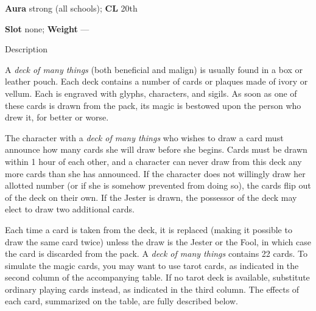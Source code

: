\textbf{Aura} strong (all schools); \textbf{CL} 20th
				
\textbf{Slot} none; \textbf{Weight }---
				
Description
				
A \textit{deck of many things }(both beneficial and malign) is usually found in a box or leather pouch. Each deck contains a number of cards or plaques made of ivory or vellum. Each is engraved with glyphs, characters, and sigils. As soon as one of these cards is drawn from the pack, its magic is bestowed upon the person who drew it, for better or worse.
				
The character with a \textit{deck of many things }who wishes to draw a card must announce how many cards she will draw before she begins. Cards must be drawn within 1 hour of each other, and a character can never draw from this deck any more cards than she has announced. If the character does not willingly draw her allotted number (or if she is somehow prevented from doing so), the cards flip out of the deck on their own. If the Jester is drawn, the possessor of the deck may elect to draw two additional cards.
				
Each time a card is taken from the deck, it is replaced (making it possible to draw the same card twice) unless the draw is the Jester or the Fool, in which case the card is discarded from the pack. A \textit{deck of many things }contains 22 cards. To simulate the magic cards, you may want to use tarot cards, as indicated in the second column of the accompanying table. If no tarot deck is available, substitute ordinary playing cards instead, as indicated in the third column. The effects of each card, summarized on the table, are fully described below.
				

